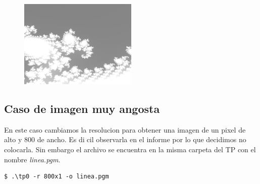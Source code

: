 \documentclass[a4paper,10pt]{article}
\begin{document}
\begin{figure}[H]
\begin{center}
\includegraphics[width=0.5\textwidth]{imagenes/dos.png}
\caption{} \label{dos}
\end{center}
\end{figure}

\subsection{Caso de imagen muy angosta}
En este caso cambiamos la resolucion para obtener una imagen de un pixel
de alto y 800 de ancho. Es dicil observarla en el informe por lo que decidimos
no colocarla. Sin embargo el archivo se encuentra en la misma carpeta del TP con el nombre \textit{linea.pgm}.

\begin{lstlisting}[frame=single]
$ .\tp0 -r 800x1 -o linea.pgm
\end{lstlisting}
\end{document}
